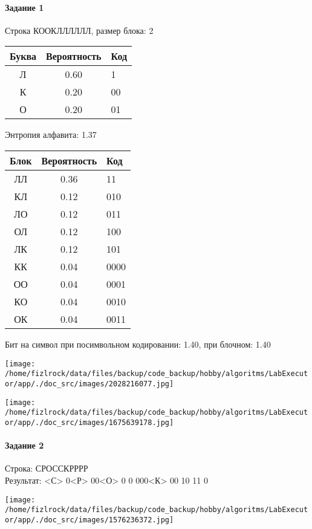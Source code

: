 \documentclass[a4paper, 12pt]{article}
\begin{document}
\paragraph{Задание 1}

Строка КООКЛЛЛЛЛЛ, размер блока: 2
\begin{center}
 \begin{tabular}{ |c|c|l| } 
  \hline
     Буква & Вероятность & Код\\ \hline
Л & 0.60 & 1\\\hline
К & 0.20 & 00\\\hline
О & 0.20 & 01
\\ \hline \end{tabular}
\end{center}
Энтропия алфавита: 1.37
\begin{center}
 \begin{tabular}{ |c|c|l| } 
  \hline
     Блок & Вероятность & Код\\ \hline
ЛЛ & 0.36 & 11\\\hline
КЛ & 0.12 & 010\\\hline
ЛО & 0.12 & 011\\\hline
ОЛ & 0.12 & 100\\\hline
ЛК & 0.12 & 101\\\hline
КК & 0.04 & 0000\\\hline
ОО & 0.04 & 0001\\\hline
КО & 0.04 & 0010\\\hline
ОК & 0.04 & 0011
\\ \hline \end{tabular}
\end{center}
Бит на символ при посимвольном кодировании: 1.40, при блочном: 1.40

\texttt{[image: /home/fizlrock/data/files/backup/code\_backup/hobby/algoritms/LabExecutor/app/./doc\_src/images/2028216077.jpg]}

\texttt{[image: /home/fizlrock/data/files/backup/code\_backup/hobby/algoritms/LabExecutor/app/./doc\_src/images/1675639178.jpg]}
\pagebreak
\paragraph{Задание 2}

Строка: 
СРОССКРРРР\\
Результат: <С> 0<Р> 00<О> 0 0 000<К> 00 10 11 0

\texttt{[image: /home/fizlrock/data/files/backup/code\_backup/hobby/algoritms/LabExecutor/app/./doc\_src/images/1576236372.jpg]}
\end{document}
